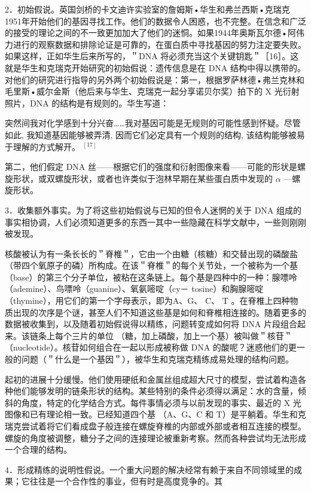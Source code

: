2．初始假说。英国剑桥的卡文迪许实验室的詹姆斯•华生和弗兰西斯•克瑞克1951年开始他们的基因寻找工作。他们的数据令人困惑，也不完整。在信念和广泛的接受的理论之间的不一致更加加大了他们的迷恫。如果1944年奥斯瓦尔德•阿伟力进行的观察数据和排除论证是可靠的，在蛋白质中寻找基因的努力注定要失败。如果这样，正如华生后来所写的，＂DNA 将必须充当这个关键钥匙＂［16］。这就是华生和克瑞克开始研究的初始假说：遗传信息是在 DNA 结构中得以携带的。对他们的研究进行指导的另外两个初始假说是：第一，根据罗萨林德•弗兰克林和毛里斯•威尔金斯（他后来与华生、克瑞克一起分享诺贝尔奖）拍下的 X 光衍射照片，DNA 的结构是有规则的。华生写道：

\begin{displayquote}
突然间我对化学感到十分兴奋……我对基因可能是无规则的可能性感到怀疑。尽管如此, 我知道基因能够被弄清, 因而它们必定具有一个规则的结构, 该结构能够被易于理解的方式解开。 ${ }^{[17]}$
\end{displayquote}

第二，他们假定 DNA 丝——根据它们的强度和衍射图像来看——可能的形状是螺旋形状，或双螺旋形状，或者也许类似于泡林早期在某些蛋白质中发现的 $\alpha$ —螺旋形状。

3．收集额外事实。为了将这些初始假说与已知的但令人迷惘的关于 DNA 组成的事实相协调，人们必须知道更多的东西一其中一些隐藏在科学文献中，一些则刚刚被发现。

核酸被认为有一条长长的＂脊椎＂，它由一个由糖（核糖）和交替出现的磷酸盐（带四个氧原子的磷）所构成。在该＂脊椎＂的每个关节处，一个被称为一个基（base）的第三个分子单位，被粘在这条链上。每个基是四种中的一种：腺嘌呤（ademine）、鸟嘌呤（guanine）、氧氨嘧啶（cy－ tosine）和胸腺嘧啶（thymine），用它们的第一个字母表示，即为A、G、 C、 T 。在脊椎上四种物质出现的次序是个谜，甚至人们不知道这些基是如何和脊椎相连接的。随着更多的数据被收集到，以及随着初始假说得以精练，问题转变成如何将 DNA 片段组合起来。该链条上每个三片的单位 （糖，加上磷酸，加上一个基）被叫做＂核苷＂（nucleotide）。核苷如何组合在一起以形成被称做 DNA 的酸呢？迷惑他们的更一般的问题（＂什么是一个基因＂），被华生和克瑞克精练成易处理的结构问题。

起初的进展十分缓慢。他们使用硬纸和金属丝组成超大尺寸的模型，尝试着构造各种他们能够发明的链条形状的结构。某些特别的条件必须得以满足：水的含量，倾斜的角度，特定的化学结合方式。每件事情必须与以前发现的事实、最近的 X 光图像和已有理论相一致。已经知道四个基 （A、G、C 和 T）是平躺着。华生和克瑞克尝试着将它们看成盘子般连接在螺旋脊椎的内部或外部或者相互连接的模型。螺旋的角度被调整，糖分子之间的连接理论被重新考察。然而各种尝试均无法形成一个合理的结构。

4．形成精练的说明性假说。一个重大问题的解决经常有赖于来自不同领域里的成果；它往往是一个合作性的事业，但有时是高度竞争的。其

